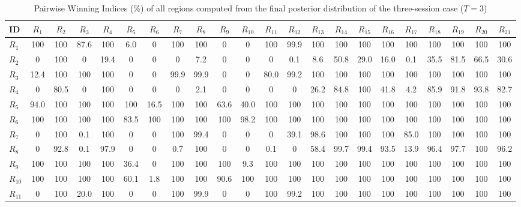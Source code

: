 \begin{table}[h!]
\centering
\footnotesize
\caption{Pairwise Winning Indices (\%) of all regions computed from the final posterior distribution of the three-session case ($T=3$)}
\label{tab:S4_pwi_t3}
\begin{tabularx}{\textwidth}{X|CCCCCCCCCCCCCCCCCCCCC}
\toprule
ID&$R_{1}$&$R_{2}$&$R_{3}$&$R_{4}$&$R_{5}$&$R_{6}$&$R_{7}$&$R_{8}$&$R_{9}$&$R_{10}$&$R_{11}$&$R_{12}$&$R_{13}$&$R_{14}$&$R_{15}$&$R_{16}$&$R_{17}$&$R_{18}$&$R_{19}$&$R_{20}$&$R_{21}$\\
\midrule
$R_{1}$ & 100 & 100 & 87.6 & 100 & 6.0 & 0 & 100 & 100 & 0 & 0 & 100 & 99.9 & 100 & 100 & 100 & 100 & 100 & 100 & 100 & 100 & 100 \\
$R_{2}$ & 0 & 100 & 0 & 19.4 & 0 & 0 & 0 & 7.2 & 0 & 0 & 0 & 0.1 & 8.6 & 50.8 & 29.0 & 16.0 & 0.1 & 35.5 & 81.5 & 66.5 & 30.6 \\
$R_{3}$ & 12.4 & 100 & 100 & 100 & 0 & 0 & 99.9 & 99.9 & 0 & 0 & 80.0 & 99.2 & 100 & 100 & 100 & 100 & 100 & 100 & 100 & 100 & 100 \\
$R_{4}$ & 0 & 80.5 & 0 & 100 & 0 & 0 & 0 & 2.1 & 0 & 0 & 0 & 0 & 26.2 & 84.8 & 100 & 41.8 & 4.2 & 85.9 & 91.8 & 93.8 & 82.7 \\
$R_{5}$ & 94.0 & 100 & 100 & 100 & 100 & 16.5 & 100 & 100 & 63.6 & 40.0 & 100 & 100 & 100 & 100 & 100 & 100 & 100 & 100 & 100 & 100 & 100 \\
$R_{6}$ & 100 & 100 & 100 & 100 & 83.5 & 100 & 100 & 100 & 100 & 98.2 & 100 & 100 & 100 & 100 & 100 & 100 & 100 & 100 & 100 & 100 & 100 \\
$R_{7}$ & 0 & 100 & 0.1 & 100 & 0 & 0 & 100 & 99.4 & 0 & 0 & 0 & 39.1 & 98.6 & 100 & 100 & 100 & 85.0 & 100 & 100 & 100 & 100 \\
$R_{8}$ & 0 & 92.8 & 0.1 & 97.9 & 0 & 0 & 0.7 & 100 & 0 & 0 & 0.1 & 0 & 58.4 & 99.7 & 99.4 & 93.5 & 13.9 & 96.4 & 97.7 & 100 & 96.2 \\
$R_{9}$ & 100 & 100 & 100 & 100 & 36.4 & 0 & 100 & 100 & 100 & 9.3 & 100 & 100 & 100 & 100 & 100 & 100 & 100 & 100 & 100 & 100 & 100 \\
$R_{10}$ & 100 & 100 & 100 & 100 & 60.1 & 1.8 & 100 & 100 & 90.6 & 100 & 100 & 100 & 100 & 100 & 100 & 100 & 100 & 100 & 100 & 100 & 100 \\
$R_{11}$ & 0 & 100 & 20.0 & 100 & 0 & 0 & 100 & 99.9 & 0 & 0 & 100 & 99.2 & 100 & 100 & 100 & 100 & 100 & 100 & 100 & 100 & 100 \\

\end{tabularx}
\end{table}
